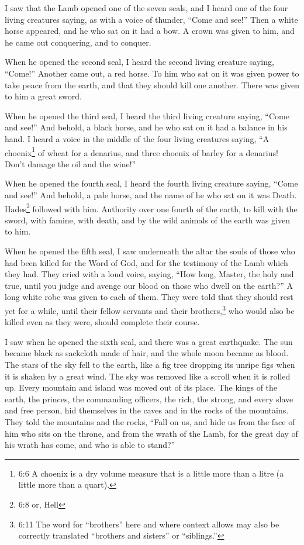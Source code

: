  I saw that the Lamb opened one of the seven seals, and I
heard one of the four living creatures saying, as with a voice of
thunder, ``Come and see!''  Then a white horse appeared, and
he who sat on it had a bow. A crown was given to him, and he came out
conquering, and to conquer.

 When he opened the second seal, I heard the second living
creature saying, ``Come!''  Another came out, a red horse.
To him who sat on it was given power to take peace from the earth, and
that they should kill one another. There was given to him a great sword.

 When he opened the third seal, I heard the third living
creature saying, ``Come and see!'' And behold, a black horse, and he who
sat on it had a balance in his hand.  I heard a voice in the
middle of the four living creatures saying, ``A choenix\footnote{6:6 A
  choenix is a dry volume measure that is a little more than a litre (a
  little more than a quart).} of wheat for a denarius, and three choenix
of barley for a denarius! Don't damage the oil and the wine!''

 When he opened the fourth seal, I heard the fourth living
creature saying, ``Come and see!''  And behold, a pale
horse, and the name of he who sat on it was Death. Hades\footnote{6:8
  or, Hell} followed with him. Authority over one fourth of the earth,
to kill with the sword, with famine, with death, and by the wild animals
of the earth was given to him.

 When he opened the fifth seal, I saw underneath the altar
the souls of those who had been killed for the Word of God, and for the
testimony of the Lamb which they had.  They cried with a
loud voice, saying, ``How long, Master, the holy and true, until you
judge and avenge our blood on those who dwell on the earth?''
 A long white robe was given to each of them. They were
told that they should rest yet for a while, until their fellow servants
and their brothers,\footnote{6:11 The word for ``brothers'' here and
  where context allows may also be correctly translated ``brothers and
  sisters'' or ``siblings.''} who would also be killed even as they
were, should complete their course.

 I saw when he opened the sixth seal, and there was a great
earthquake. The sun became black as sackcloth made of hair, and the
whole moon became as blood.  The stars of the sky fell to
the earth, like a fig tree dropping its unripe figs when it is shaken by
a great wind.  The sky was removed like a scroll when it is
rolled up. Every mountain and island was moved out of its place.
 The kings of the earth, the princes, the commanding
officers, the rich, the strong, and every slave and free person, hid
themselves in the caves and in the rocks of the mountains. 
They told the mountains and the rocks, ``Fall on us, and hide us from
the face of him who sits on the throne, and from the wrath of the Lamb,
 for the great day of his wrath has come, and who is able
to stand?''

